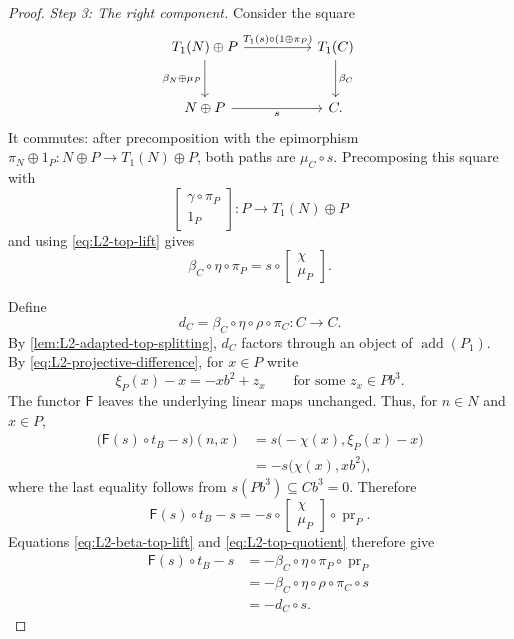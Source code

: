 \documentclass[a4paper,11pt,reqno]{amsart}
\theoremstyle{definition}
\theoremstyle{plain}
\numberwithin{equation}{section}
\begin{document}
\begin{proof}
\smallskip\noindent\emph{Step 3: The right component.}
Consider the square
\begin{equation}
\label{eq:L2-beta-compatibility}
\begin{tikzcd}[column sep=huge,row sep=large]
 T_1(N)\oplus P
  \arrow[r,"T_1(s)\circ(1\oplus\pi_P)"]
  \arrow[d,"\beta_N\oplus\mu_P"']&
 T_1(C)\arrow[d,"\beta_C"]\\
 N\oplus P\arrow[r,"s"']&C.
\end{tikzcd}
\end{equation}
It commutes: after precomposition with the epimorphism
\(\pi_N\oplus1_P:N\oplus P\to T_1(N)\oplus P\), both paths are
\(\mu_C\circ s\).  Precomposing this square with
\[
 \begin{bmatrix}\gamma\circ\pi_P\\1_P\end{bmatrix}:
 P\longrightarrow T_1(N)\oplus P
\]
and using \eqref{eq:L2-top-lift} gives
\begin{equation}
\label{eq:L2-beta-top-lift}
 \beta_C\circ\eta\circ\pi_P
 =
 s\circ
 \begin{bmatrix}
  \chi\\ \mu_P
 \end{bmatrix}.
\end{equation}

Define
\begin{equation}
\label{eq:L2-right-defect}
 d_C=\beta_C\circ\eta\circ\rho\circ\pi_C:C\longrightarrow C.
\end{equation}
By \cref{lem:L2-adapted-top-splitting}, \(d_C\) factors through an object
of \(\operatorname{add}(P_1)\).  By
\eqref{eq:L2-projective-difference}, for \(x\in P\) write
\[
 \xi_P(x)-x=-xb^2+z_x
 \qquad\text{for some }z_x\in Pb^3.
\]
The functor \(\mathsf F\) leaves the underlying linear maps unchanged.
Thus, for \(n\in N\) and \(x\in P\),
\[
\begin{aligned}
 \bigl(\mathsf F(s)\circ t_B-s\bigr)(n,x)
 &=s\bigl(-\chi(x),\xi_P(x)-x\bigr)\\
 &=-s\bigl(\chi(x),xb^2\bigr),
\end{aligned}
\]
where the last equality follows from
\(s(Pb^3)\subseteq Cb^3=0\).  Therefore
\[
 \mathsf F(s)\circ t_B-s
 =
 -s\circ
 \begin{bmatrix}
  \chi\\ \mu_P
 \end{bmatrix}
 \circ\operatorname{pr}_P.
\]
Equations \eqref{eq:L2-beta-top-lift} and
\eqref{eq:L2-top-quotient} therefore give
\[
\begin{aligned}
 \mathsf F(s)\circ t_B-s
 &=-\beta_C\circ\eta\circ\pi_P\circ\operatorname{pr}_P\\
 &=-\beta_C\circ\eta\circ\rho\circ\pi_C\circ s\\
 &=-d_C\circ s.
\end{aligned}
\]


\end{proof}
\end{document}
